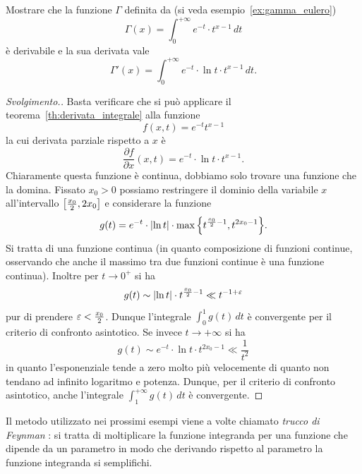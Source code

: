 \begin{exercise}
  Mostrare 
  che la funzione $\Gamma$ definita da (si veda esempio~\ref{ex:gamma_eulero})
  \[
   \Gamma(x) = \int_0^{+\infty} e^{-t}\cdot t^{x-1}\, dt 
  \]
  è derivabile e la sua derivata vale 
  \[
  \Gamma'(x) = \int_0^{+\infty} e^{-t}\cdot \ln t \cdot t^{x-1}\, dt.  
  \]
\end{exercise}
\begin{proof}[Svolgimento.]
Basta verificare che si può applicare il teorema~\ref{th:derivata_integrale}
alla funzione 
\[
  f(x,t) = e^{-t}t^{x-1}
\]
la cui derivata parziale rispetto a $x$ è 
\[
  \frac{\partial f}{\partial x}(x,t) = e^{-t}\cdot \ln t \cdot t^{x-1}.  
\]
Chiaramente questa funzione è continua, dobbiamo solo trovare una funzione 
che la domina. Fissato $x_0>0$ possiamo restringere il dominio della 
variabile $x$ all'intervallo $\left[\frac{x_0} 2,2x_0\right]$ e considerare
la funzione 
\[
  g(t) = e^{-t} \cdot {\left|\ln t\right|}\cdot \max{\left\{ t^{\frac {x_0} 2 -1},t^{2x_0 -1} \right\}}.
\]
Si tratta di una funzione continua (in quanto composizione di funzioni continue, 
osservando che anche il massimo tra due funzioni continue è una funzione continua).
Inoltre per $t\to 0^+$ si ha 
\[
  g(t) \sim {\left|\ln t\right|}\cdot t^{\frac{x_0}{2}-1} 
  \ll t^{-1+\varepsilon}
\]
pur di prendere $\varepsilon < \frac{x_0}{2}$.
Dunque l'integrale $\int_0^1 g(t)\, dt$ è convergente per 
il criterio di confronto asintotico.
Se invece $t\to +\infty$ si ha 
\[
  g(t) \sim e^{-t}\cdot \ln t \cdot t^{2x_0-1} \ll \frac{1}{t^2}  
\]
in quanto l'esponenziale tende a zero molto più velocemente 
di quanto non tendano ad infinito logaritmo e potenza.
Dunque, per il criterio di confronto asintotico, 
anche l'integrale $\int_1^{+\infty} g(t)\, dt$ è convergente.
\end{proof}

Il metodo utilizzato nei prossimi esempi viene a volte chiamato
 \emph{trucco di Feynman}%
:
%
%
si tratta di moltiplicare la funzione integranda per una funzione 
che dipende da un parametro in modo che derivando rispetto al parametro 
la funzione integranda si semplifichi.

